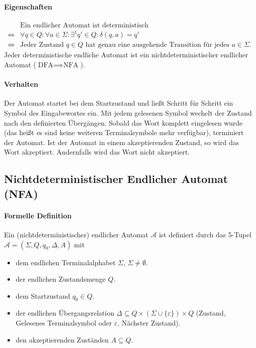 \documentclass[a4paper, 11pt, accentcolor = tud3b]{tudreport}
\begin{document}
            \paragraph{Eigenschaften}
                \begin{equation*}
                    \begin{split}
                             & \text{Ein endlicher Automat ist deterministisch}
                        \\
                        \iff & \forall q \in Q : \forall a \in \Sigma : \exists ^ 1 q' \in Q : \delta(q, a) = q'
                        \\
                        \iff & \text{Jeder Zustand } q \in Q \text{ hat genau eine ausgehende Transition für jedes } a \in \Sigma.
                    \end{split}
                \end{equation*}
                Jeder deterministische endliche Automat ist ein nichtdeterministischer endlicher Automat ($ \text{DFA} \implies \text{NFA} $).

            \paragraph{Verhalten}
                \label{dfa:verhalten}
                Der Automat startet bei dem Startzustand und ließt Schritt für Schritt ein Symbol des Eingabewortes ein. Mit jedem gelesenen Symbol wechelt der Zustand nach den definierten Übergängen. Sobald das Wort komplett eingelesen wurde (das heißt es sind keine weiteren Terminalsymbole mehr verfügbar), terminiert der Automat. Ist der Automat in einem akzeptierenden Zustand, so wird das Wort akzeptiert. Andernfalls wird das Wort nicht akzeptiert.


        \subsection{Nichtdeterministischer Endlicher Automat (NFA)}
            \paragraph{Formelle Definition}
                Ein (nichtdeterministischer) endlicher Automat $ \mathcal{A} $ ist definiert durch das 5-Tupel $ \mathcal{A} = (\Sigma, Q, q _ 0, \Delta, A) $ mit
                \begin{itemize}
                    \item dem endlichen Terminalalphabet $ \Sigma $, $ \Sigma \neq \emptyset $.
                    \item der endlichen Zustandsmenge $ Q $.
                    \item dem Startzustand $ q _ 0 \in Q $.
                    \item der endlichen Übergangsrelation $ \Delta \subseteq Q \times (\Sigma \cup \{ \varepsilon \}) \times Q $ (Zustand, Gelesenes Terminalsymbol oder $ \varepsilon $, Nächster Zustand).
                    \item den akzeptierenden Zuständen $ A \subseteq Q $.
                \end{itemize}
\end{document}
